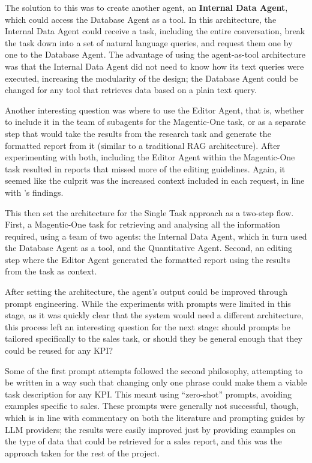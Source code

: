 \documentclass[a4paper]{report}
\begin{document}
The solution to this was to create another agent, an \textbf{Internal Data Agent}, which could access the Database Agent as a tool. In this architecture, the Internal Data Agent could receive a task, including the entire conversation, break the task down into a set of natural language queries, and request them one by one to the Database Agent. The advantage of using the agent-as-tool architecture was that the Internal Data Agent did not need to know how its text queries were executed, increasing the modularity of the design; the Database Agent could be changed for any tool that retrieves data based on a plain text query.

Another interesting question was where to use the Editor Agent, that is, whether to include it in the team of subagents for the Magentic-One task, or as a separate step that would take the results from the research task and generate the formatted report from it (similar to a traditional RAG architecture). After experimenting with both, including the Editor Agent within the Magentic-One task resulted in reports that missed more of the editing guidelines. Again, it seemed like the culprit was the increased context included in each request, in line with \cite{veseli2025positionalbiasesshiftinputs}'s findings.

This then set the architecture for the Single Task approach as a two-step flow. First, a Magentic-One task for retrieving and analysing all the information required, using a team of two agents: the Internal Data Agent, which in turn used the Database Agent as a tool, and the Quantitative Agent. Second, an editing step where the Editor Agent generated the formatted report using the results from the task as context.

After setting the architecture, the agent's output could be improved through prompt engineering. While the experiments with prompts were limited in this stage, as it was quickly clear that the system would need a different architecture, this process left an interesting question for the next stage: should prompts be tailored specifically to the sales task, or should they be general enough that they could be reused for any KPI?

Some of the first prompt attempts followed the second philosophy, attempting to be written in a way such that changing only one phrase could make them a viable task description for any KPI. This meant using ``zero-shot'' prompts, avoiding examples specific to sales. These prompts were generally not successful, though, which is in line with commentary on both the literature and prompting guides by LLM providers; the results were easily improved just by providing examples on the type of data that could be retrieved for a sales report, and this was the approach taken for the rest of the project.
\end{document}
